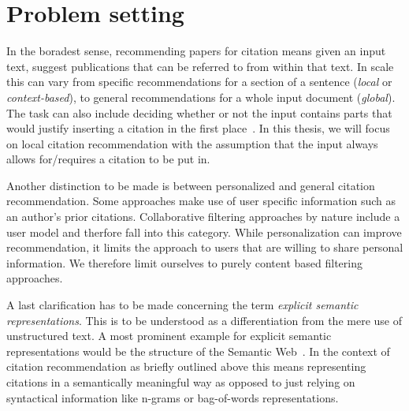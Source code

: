 

\section{Problem setting}\label{sec:problemsetting}
In the boradest sense, recommending papers for citation means given an input text, suggest publications that can be referred to from within that text. In scale this can vary from specific recommendations for a section of a sentence (\emph{local} or \emph{context-based}), to general recommendations for a whole input document (\emph{global}). The task can also include deciding whether or not the input contains parts that would justify inserting a citation in the first place~\cite{He2011}. In this thesis, we will focus on local citation recommendation with the assumption that the input always allows for/requires a citation to be put in.

Another distinction to be made is between personalized and general citation recommendation. Some approaches make use of user specific information such as an author's prior citations. Collaborative filtering approaches by nature include a user model and therfore fall into this category. While personalization can improve recommendation, it limits the approach to users that are willing to share personal information. %
We therefore limit ourselves to purely content based filtering approaches.

A last clarification has to be made concerning the term \emph{explicit semantic representations}. This is to be understood as a differentiation from the mere use of unstructured text. A most prominent example for explicit semantic representations would be the structure of the Semantic Web~\cite{Berners-Lee2001}. In the context of citation recommendation as briefly outlined above this means representing citations in a semantically meaningful way as opposed to just relying on syntactical information like n-grams or bag-of-words representations.

